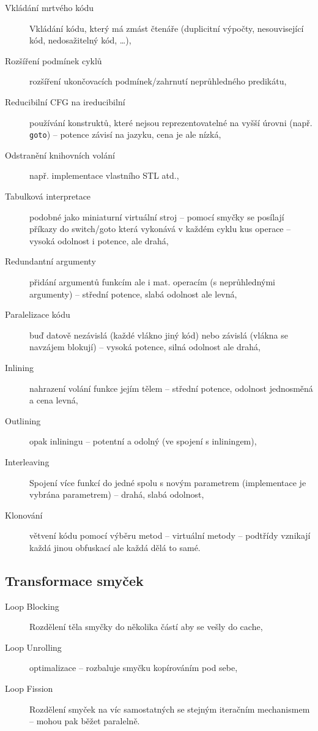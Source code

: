 \begin{description}
    \item[Vkládání mrtvého kódu] Vkládání kódu, který má zmást čtenáře (duplicitní výpočty, nesouvisející kód, nedosažitelný kód, \dots),
    \item[Rozšíření podmínek cyklů] rozšíření ukončovacích podmínek/zahrnutí neprůhledného predikátu,
    \item[Reducibilní CFG na ireducibilní] používání konstruktů, které nejsou reprezentovatelné na vyšší úrovni (např. \texttt{goto}) -- potence závisí na jazyku, cena je ale nízká,
    \item[Odstranění knihovních volání] např. implementace vlastního STL atd.,
    \item[Tabulková interpretace] podobné jako miniaturní virtuální stroj -- pomocí smyčky se posílají příkazy do switch/goto která vykonává v každém cyklu kus operace -- vysoká odolnost i potence, ale drahá,
    \item[Redundantní argumenty] přidání argumentů funkcím ale i mat. operacím (s neprůhlednými argumenty) -- střední potence, slabá odolnost ale levná,
    \item[Paralelizace kódu] buď datově nezávislá (každé vlákno jiný kód) nebo závislá (vlákna se navzájem blokují) -- vysoká potence, silná odolnost ale drahá,
    \item[Inlining] nahrazení volání funkce jejím tělem -- střední potence, odolnost jednosměná a cena levná,
    \item[Outlining] opak inliningu -- potentní a odolný (ve spojení s inliningem),
    \item[Interleaving] Spojení více funkcí do jedné spolu s novým parametrem (implementace je vybrána parametrem) -- drahá, slabá odolnost,
    \item[Klonování] větvení kódu pomocí výběru metod -- virtuální metody -- podtřídy vznikají každá jinou obfuskací ale každá dělá to samé.
\end{description}

\subsection*{Transformace smyček}

\begin{description}
    \item[Loop Blocking] Rozdělení těla smyčky do několika částí aby se vešly do cache,
    \item[Loop Unrolling] optimalizace -- rozbaluje smyčku kopírováním pod sebe,
    \item[Loop Fission] Rozdělení smyček na víc samostatných se stejným iteračním mechanismem -- mohou pak běžet paralelně.
\end{description}

